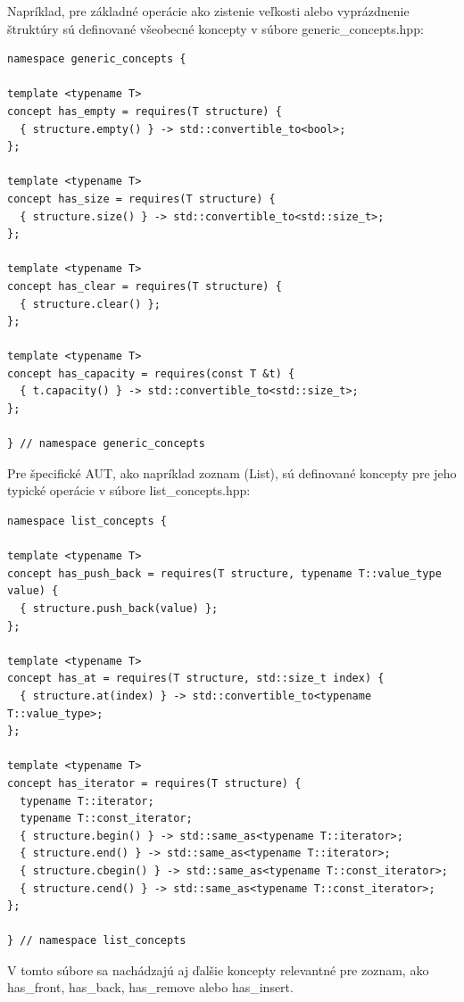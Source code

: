 \documentclass[11pt]{article}
\begin{document}
Napríklad, pre základné operácie ako zistenie veľkosti alebo vyprázdnenie štruktúry sú definované všeobecné koncepty v súbore generic\_concepts.hpp:

\begin{lstlisting}[caption={Ukážka všeobecných konceptov (generic\_concepts.hpp)}, label={lst:generic_concepts}]
namespace generic_concepts {

template <typename T>
concept has_empty = requires(T structure) {
  { structure.empty() } -> std::convertible_to<bool>;
};

template <typename T>
concept has_size = requires(T structure) {
  { structure.size() } -> std::convertible_to<std::size_t>;
};

template <typename T>
concept has_clear = requires(T structure) {
  { structure.clear() };
};

template <typename T>
concept has_capacity = requires(const T &t) {
  { t.capacity() } -> std::convertible_to<std::size_t>;
};

} // namespace generic_concepts
\end{lstlisting}

Pre špecifické AUT, ako napríklad zoznam (List), sú definované koncepty pre jeho typické operácie v súbore list\_concepts.hpp:
\begin{lstlisting}[caption={Ukážka konceptov pre zoznam (list\_concepts.hpp)}, label={lst:list_concepts}]
namespace list_concepts {

template <typename T>
concept has_push_back = requires(T structure, typename T::value_type value) {
  { structure.push_back(value) };
};

template <typename T>
concept has_at = requires(T structure, std::size_t index) {
  { structure.at(index) } -> std::convertible_to<typename T::value_type>;
};

template <typename T>
concept has_iterator = requires(T structure) {
  typename T::iterator;
  typename T::const_iterator;
  { structure.begin() } -> std::same_as<typename T::iterator>;
  { structure.end() } -> std::same_as<typename T::iterator>;
  { structure.cbegin() } -> std::same_as<typename T::const_iterator>;
  { structure.cend() } -> std::same_as<typename T::const_iterator>;
};

} // namespace list_concepts
\end{lstlisting}

\noindent V tomto súbore sa nachádzajú aj ďalšie koncepty relevantné pre zoznam, ako has\_front, has\_back, has\_remove alebo has\_insert.
\end{document}
